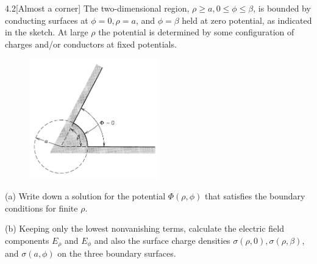 \documentclass[12pt]{article}
\begin{document}
\begin{problem}{4.2}[Almost a corner]
The two-dimensional region, $\rho\geq a,0\leq\phi\leq\beta$, is bounded by
conducting surfaces at $\phi=0,\rho=a$, and $\phi=\beta$ held at zero potential,
as indicated in the sketch. At large $\rho$ the potential is determined by some
configuration of charges and/or conductors at fixed potentials.

\begin{figure}[h]
    \centering
    \includegraphics[width=0.5\textwidth]{hw4_p2.jpg}
\end{figure}

(a) Write down a solution for the potential $\Phi(\rho,\phi)$ that satisfies the
boundary conditions for finite $\rho$.

(b) Keeping only the lowest nonvanishing terms, calculate the electric field
components $E_\rho$ and $E_\phi$ and also the surface charge densities
$\sigma(\rho,0),\sigma(\rho,\beta)$, and $\sigma(a,\phi)$ on the three boundary
surfaces.


\end{problem}
\end{document}
